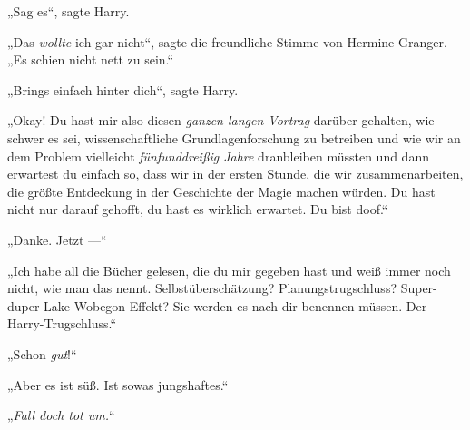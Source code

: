 „Sag es“, sagte Harry.

„Das \emph{wollte} ich gar nicht“, sagte die freundliche Stimme von Hermine Granger.
„Es schien nicht nett zu sein.“

„Brings einfach hinter dich“, sagte Harry.

„Okay! Du hast mir also diesen \emph{ganzen langen Vortrag} darüber gehalten, wie schwer es sei, wissenschaftliche Grundlagenforschung zu betreiben und wie wir an dem Problem vielleicht \emph{fünfunddreißig Jahre} dranbleiben müssten und dann erwartest du einfach so, dass wir in der ersten Stunde, die wir zusammenarbeiten, die größte Entdeckung in der Geschichte der Magie machen würden. Du hast nicht nur darauf gehofft, du hast es wirklich erwartet. Du bist doof.“

„Danke. Jetzt —“

„Ich habe all die Bücher gelesen, die du mir gegeben hast und weiß immer noch nicht, wie man das nennt. Selbstüberschätzung? Planungstrugschluss? Super-duper-Lake-Wobegon-Effekt? Sie werden es nach dir benennen müssen. Der Harry-Trugschluss.“%

„Schon \emph{gut}!“

„Aber es ist süß. Ist sowas jungshaftes.“

„\emph{Fall doch tot um.}“

